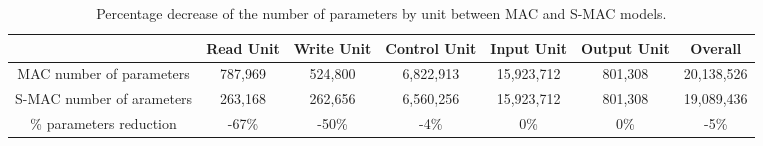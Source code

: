 \begin{table}[]
\centering
	\begin{tabular}{|c|c|c|c|c|c|c|}
		\hline
		                & Read Unit               & Write Unit &  Control Unit       & Input Unit & Output Unit & Overall  \\ \hline
		  MAC number of parameters  &  787,969 &  524,800        &    6,822,913          &   15,923,712   &   801,308  &       20,138,526           \\  \hline
		  S-MAC number of arameters  & 263,168  & 262,656       &    6,560,256               &  15,923,712    & 801,308    &       19,089,436           \\  \hline
		 \% parameters reduction  & -67\%  &   -50\%       &      -4\%               &  0\%    & 0\%    &     -5\%              \\  \hline
		 
		 
	\end{tabular}
	\caption{Percentage decrease of the number of parameters by unit between MAC and S-MAC models.}
	\label{results}
\end{table}